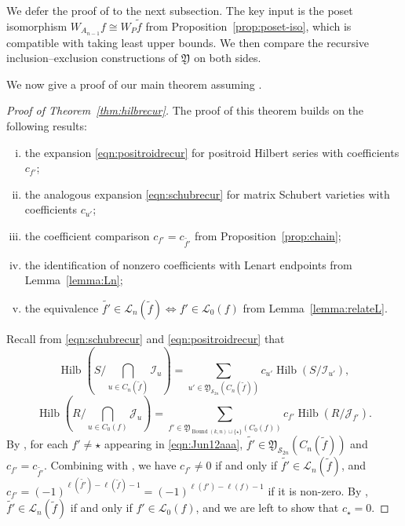 \documentclass[12pt,reqno]{amsart}
\theoremstyle{definition}
\newcommand{\cJ}{\mathcal{J}}
\newcommand{\symm}{\mathcal{S}}
\newcommand{\bound}{\operatorname{Bound}}
\newcommand{\hilb}{\operatorname{Hilb}}
\newcommand{\genP}{\mathfrak{Y}}
\newcommand{\Lenart}{\mathcal{L}}
\begin{document}
{We defer the proof of  to the next subsection. The key input is the poset isomorphism \(W_{A_{n-1}}f \cong W_P\widetilde f\) from Proposition~\ref{prop:poset-iso},
which is compatible with taking least upper bounds.
We then compare the recursive inclusion--exclusion constructions of \(\genP\) on both sides.

We now give a proof of our main theorem assuming .

\begin{proof}[Proof of Theorem~\ref{thm:hilbrecur}]
The proof of this theorem builds on the following results:
\begin{enumerate}[(i)]
    \item the expansion \eqref{eqn:positroidrecur} for positroid Hilbert series with coefficients \(c_{f'}\);
    \item the analogous expansion \eqref{eqn:schubrecur} for matrix Schubert varieties with coefficients \(c_{u'}\);
    \item the coefficient comparison \(c_{f'}=c_{\widetilde{f'}}\) from Proposition~\ref{prop:chain};
    \item the identification of nonzero coefficients with Lenart endpoints from Lemma~\ref{lemma:Ln};
    \item  the equivalence \(\widetilde{f'}\in \Lenart_n(\widetilde f)\iff f'\in \Lenart_0(f)\) from Lemma~\ref{lemma:relateL}.
\end{enumerate}

Recall from \eqref{eqn:schubrecur} and \eqref{eqn:positroidrecur} that 
\[
    \hilb(S/\bigcap_{u\in C_n(\widetilde{f})}\mathcal{I}_u) = \sum_{u'\in \genP_{\symm_{2n}}(C_n(\widetilde{f}))} c_{u'}\hilb(S/\mathcal{I}_{u'}),
\]
\begin{equation}\label{eqn:Jun12aaa}
    \hilb(R/\bigcap_{u\in C_0(f)}\cJ_u) = \sum_{f'\in \genP_{\bound(k,n)\sqcup \{\star\}}(C_0(f))} c_{f'}\hilb(R/\cJ_{f'}).
\end{equation}
By , for each $f'\neq \star$ appearing in \eqref{eqn:Jun12aaa}, $\widetilde{f'}\in \genP_{\symm_{2n}}(C_n(\widetilde{f}))$ and $c_{f'} = c_{\widetilde{f'}}$. Combining with , we have $c_{f'}\neq 0$ if and only if $\widetilde{f'}\in \Lenart_n(\widetilde{f})$, and $c_{f'} = (-1)^{\ell(\widetilde{f'}) - \ell(\widetilde{f}) -1} = (-1)^{\ell(f') - \ell(f) -1}$ if it is non-zero. By , $\widetilde{f'}\in \Lenart_n(\widetilde{f})$ if and only if $f'\in \Lenart_0(f)$, and 
we are left to show that $c_\star = 0$. 


\end{proof}}
\end{document}
